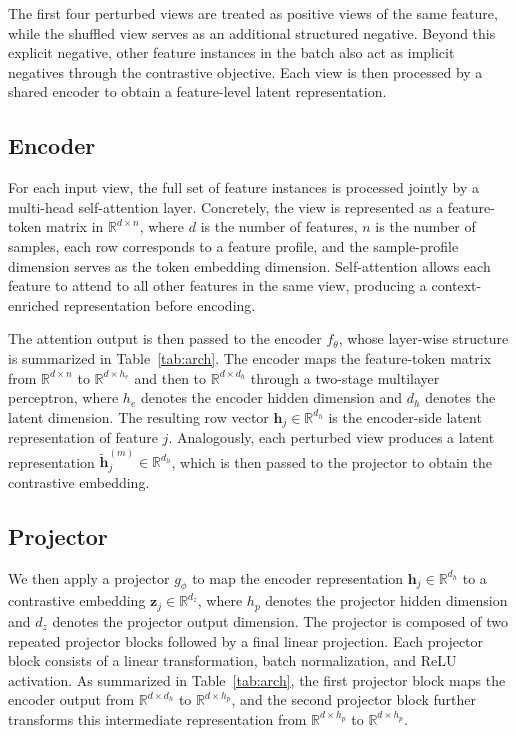 \documentclass[sigconf,natbib=true,anonymous=true]{acmart}
\begin{document}
The first four perturbed views are treated as positive views of the same
feature, while the shuffled view serves as an additional structured negative.
Beyond this explicit negative, other feature instances in the batch also act as
implicit negatives through the contrastive objective. Each view is then
processed by a shared encoder to obtain a feature-level latent representation.

\subsection{Encoder}
For each input view, the full set of feature instances is processed jointly by a
multi-head self-attention layer. Concretely, the view is represented as a
feature-token matrix in $\mathbb{R}^{d \times n}$, where $d$ is the number of
features, $n$ is the number of samples, each row corresponds to a feature
profile, and the sample-profile dimension serves as the token embedding
dimension. Self-attention allows each feature to attend to all other features in
the same view, producing a context-enriched representation before encoding.

The attention output is then passed to the encoder $f_\theta$, whose layer-wise
structure is summarized in Table~\ref{tab:arch}. The encoder maps the
feature-token matrix from $\mathbb{R}^{d \times n}$ to
$\mathbb{R}^{d \times h_e}$ and then to $\mathbb{R}^{d \times d_h}$ through a
two-stage multilayer perceptron, where $h_e$ denotes the encoder hidden
dimension and $d_h$ denotes the latent dimension. The resulting row vector
$\mathbf{h}_j \in \mathbb{R}^{d_h}$ is the encoder-side latent representation of
feature $j$. Analogously, each perturbed view produces a latent representation
$\tilde{\mathbf{h}}_j^{(m)} \in \mathbb{R}^{d_h}$, which is then passed to the
projector to obtain the contrastive embedding.

\subsection{Projector}
\label{sec:Projector}
We then apply a projector $g_\phi$ to map the encoder representation
$\mathbf{h}_j \in \mathbb{R}^{d_h}$ to a contrastive embedding
$\mathbf{z}_j \in \mathbb{R}^{d_z}$, where $h_p$ denotes the projector hidden
dimension and $d_z$ denotes the projector output dimension. The projector is
composed of two repeated projector blocks followed by a final linear
projection. Each projector block consists of a linear transformation, batch
normalization, and ReLU activation. As summarized in Table~\ref{tab:arch}, the
first projector block maps the encoder output from $\mathbb{R}^{d \times d_h}$
to $\mathbb{R}^{d \times h_p}$, and the second projector block further
transforms this intermediate representation from $\mathbb{R}^{d \times h_p}$ to
$\mathbb{R}^{d \times h_p}$.
\end{document}
